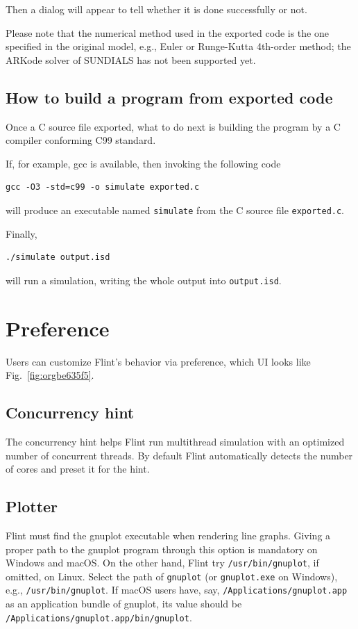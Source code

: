 \documentclass[a4paper,10pt]{report}
\begin{document}
Then a dialog will appear to tell whether it is done successfully or not.

Please note that the numerical method used in the exported code is the one
specified in the original model, e.g., Euler or Runge-Kutta 4th-order method;
the ARKode solver of SUNDIALS has not been supported yet.

\subsection{How to build a program from exported code}
\label{sec:org819280d}
Once a C source file exported, what to do next is building the program by a C compiler
conforming C99 standard.

If, for example, gcc is available, then invoking the following code
\begin{verbatim}
gcc -O3 -std=c99 -o simulate exported.c
\end{verbatim}
will produce an executable named \texttt{simulate} from the C source file \texttt{exported.c}.

Finally,
\begin{verbatim}
./simulate output.isd
\end{verbatim}
will run a simulation, writing the whole output into \texttt{output.isd}.

\section{\label{orgd1958c8}Preference}
\label{sec:orgd9d47e0}
Users can customize Flint's behavior via preference, which UI looks like
Fig.~\ref{fig:orgbe635f5}.

\subsection{Concurrency hint}
\label{sec:org899516d}
The concurrency hint helps Flint run multithread simulation with an optimized number
of concurrent threads. By default Flint automatically detects the number of cores and
preset it for the hint.

\subsection{Plotter}
\label{sec:org2b13831}
Flint must find the gnuplot executable when rendering line graphs.
Giving a proper path to the gnuplot program through this option is mandatory on
Windows and macOS. On the other hand, Flint try \texttt{/usr/bin/gnuplot}, if
omitted, on Linux.
Select the path of \texttt{gnuplot} (or \texttt{gnuplot.exe} on Windows), e.g.,
\texttt{/usr/bin/gnuplot}. If macOS users have, say,
\texttt{/Applications/gnuplot.app} as an application bundle of gnuplot,
its value should be \texttt{/Applications/gnuplot.app/bin/gnuplot}.
\end{document}
